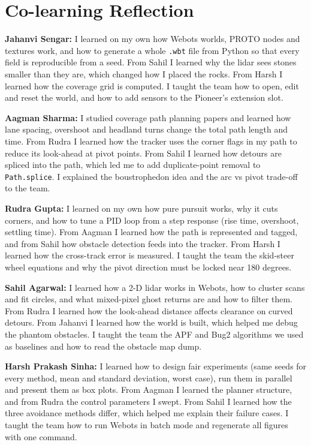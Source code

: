 \documentclass[12pt,a4paper]{article}
\begin{document}
\section{Co-learning Reflection}
\textbf{Jahanvi Sengar:} I learned on my own how Webots worlds, PROTO nodes and textures work, and how to generate a whole \texttt{.wbt} file from Python so that every field is reproducible from a seed. From Sahil I learned why the lidar sees stones smaller than they are, which changed how I placed the rocks. From Harsh I learned how the coverage grid is computed. I taught the team how to open, edit and reset the world, and how to add sensors to the Pioneer's extension slot.

\textbf{Aagman Sharma:} I studied coverage path planning papers and learned how lane spacing, overshoot and headland turns change the total path length and time. From Rudra I learned how the tracker uses the corner flags in my path to reduce its look-ahead at pivot points. From Sahil I learned how detours are spliced into the path, which led me to add duplicate-point removal to \texttt{Path.splice}. I explained the boustrophedon idea and the arc vs pivot trade-off to the team.

\textbf{Rudra Gupta:} I learned on my own how pure pursuit works, why it cuts corners, and how to tune a PID loop from a step response (rise time, overshoot, settling time). From Aagman I learned how the path is represented and tagged, and from Sahil how obstacle detection feeds into the tracker. From Harsh I learned how the cross-track error is measured. I taught the team the skid-steer wheel equations and why the pivot direction must be locked near 180 degrees.

\textbf{Sahil Agarwal:} I learned how a 2-D lidar works in Webots, how to cluster scans and fit circles, and what mixed-pixel ghost returns are and how to filter them. From Rudra I learned how the look-ahead distance affects clearance on curved detours. From Jahanvi I learned how the world is built, which helped me debug the phantom obstacles. I taught the team the APF and Bug2 algorithms we used as baselines and how to read the obstacle map dump.

\textbf{Harsh Prakash Sinha:} I learned how to design fair experiments (same seeds for every method, mean and standard deviation, worst case), run them in parallel and present them as box plots. From Aagman I learned the planner structure, and from Rudra the control parameters I swept. From Sahil I learned how the three avoidance methods differ, which helped me explain their failure cases. I taught the team how to run Webots in batch mode and regenerate all figures with one command.
\end{document}
